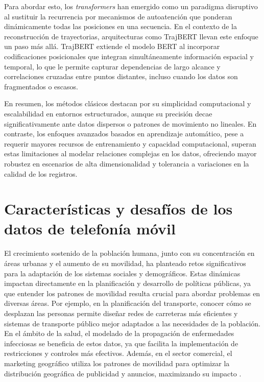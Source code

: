 Para abordar esto, los \textit{transformers} \cite{vaswani2017attention} han emergido como un paradigma disruptivo al sustituir la recurrencia por mecanismos de autoatención que ponderan dinámicamente todas las posiciones en una secuencia. En el contexto de la reconstrucción de trayectorias, arquitecturas como TrajBERT \cite{si2023trajbert} llevan este enfoque un paso más allá. TrajBERT extiende el modelo BERT \cite{devlin2018bert} al incorporar codificaciones posicionales que integran simultáneamente información espacial y temporal, lo que le permite capturar dependencias de largo alcance y correlaciones cruzadas entre puntos distantes, incluso cuando los datos son fragmentados o escasos.

En resumen, los métodos clásicos destacan por su simplicidad computacional y escalabilidad en entornos estructurados, aunque su precisión decae significativamente ante datos dispersos o patrones de movimiento no lineales. En contraste, los enfoques avanzados basados en aprendizaje automático, pese a requerir mayores recursos de entrenamiento y capacidad computacional, superan estas limitaciones al modelar relaciones complejas en los datos, ofreciendo mayor robustez en escenarios de alta dimensionalidad y tolerancia a variaciones en la calidad de los registros.

\section{Características y desafíos de los datos de telefonía móvil}

El crecimiento sostenido de la población humana, junto con su concentración en áreas urbanas y el aumento de su movilidad, ha planteado retos significativos para la adaptación de los sistemas sociales y demográficos. Estas dinámicas impactan directamente en la planificación y desarrollo de políticas públicas, ya que entender los patrones de movilidad resulta crucial para abordar problemas en diversas áreas. Por ejemplo, en la planificación del transporte, conocer cómo se desplazan las personas permite diseñar redes de carreteras más eficientes y sistemas de transporte público mejor adaptados a las necesidades de la población. En el ámbito de la salud, el modelado de la propagación de enfermedades infecciosas se beneficia de estos datos, ya que facilita la implementación de restricciones y controles más efectivos. Además, en el sector comercial, el marketing geográfico utiliza los patrones de movilidad para optimizar la distribución geográfica de publicidad y anuncios, maximizando su impacto \cite{asgari2013survey}.

